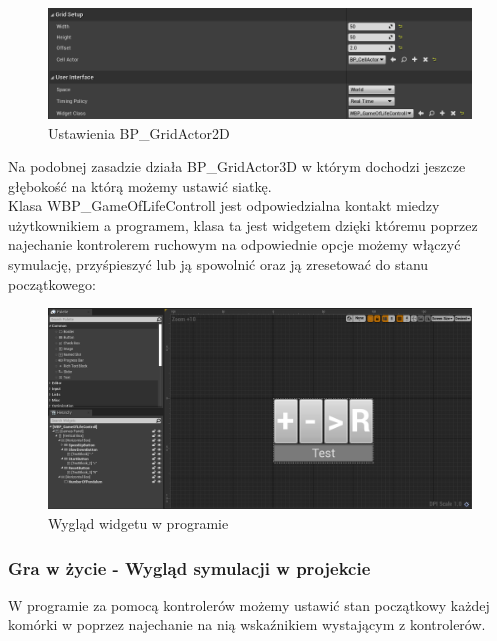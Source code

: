 \documentclass[a4paper,12pt,reqno]{article}
\begin{document}
{\begin{figure}[H]%
\centering
\includegraphics[width=0.7\columnwidth]{graphics/gameoflife/GridActor2DInUE_1.png}
\caption{Ustawienia BP\_GridActor2D 
\label{BPExample}}%
%
\qquad
\end{figure}  

Na podobnej zasadzie działa BP\_GridActor3D w którym dochodzi jeszcze głębokość na którą możemy ustawić siatkę.\\

Klasa WBP\_GameOfLifeControll jest odpowiedzialna kontakt miedzy użytkownikiem a programem, klasa ta jest widgetem dzięki któremu poprzez najechanie kontrolerem ruchowym na odpowiednie opcje możemy włączyć symulację, przyśpieszyć lub ją spowolnić oraz ją zresetować do stanu początkowego:

\begin{figure}[H]%
\centering
\includegraphics[width=0.7\columnwidth]{graphics/gameoflife/GameOfLifeControllInUE_1.png}
\caption{Wygląd widgetu w programie
\label{BPExample}}%
%
\qquad
\end{figure}  
}
\subsubsection{Gra w życie - Wygląd symulacji w projekcie}
W programie za pomocą kontrolerów możemy ustawić stan początkowy każdej komórki w poprzez najechanie na nią wskaźnikiem wystającym z kontrolerów.
\end{document}
